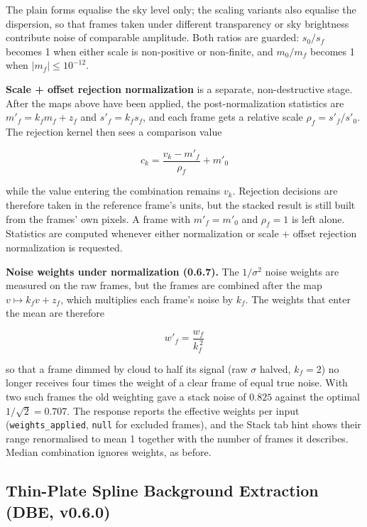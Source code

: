 \documentclass[11pt,a4paper]{article}
\newcommand{\code}[1]{\texttt{\small #1}}
\begin{document}
    The plain forms equalise the sky level only; the scaling variants also equalise the dispersion, so that frames taken under different transparency or sky brightness contribute noise of comparable amplitude. Both ratios are guarded: $s_0/s_f$ becomes 1 when either scale is non-positive or non-finite, and $m_0/m_f$ becomes 1 when $\left| m_f \right| \le 10^{-12}$.

    \textbf{Scale + offset rejection normalization} is a separate, non-destructive stage. After the maps above have been applied, the post-normalization statistics are $m'_f = k_f m_f + z_f$ and $s'_f = k_f s_f$, and each frame gets a relative scale $\rho_f = s'_f / s'_0$. The rejection kernel then sees a comparison value

    \begin{equation}
        \boxed{
            c_k = \frac{v_k - m'_f}{\rho_f} + m'_0
        }
    \end{equation}

    while the value entering the combination remains $v_k$. Rejection decisions are therefore taken in the reference frame's units, but the stacked result is still built from the frames' own pixels. A frame with $m'_f = m'_0$ and $\rho_f = 1$ is left alone. Statistics are computed whenever either normalization or scale + offset rejection normalization is requested.

    \textbf{Noise weights under normalization (0.6.7).} The $1/\sigma^2$ noise weights are measured on the raw frames, but the frames are combined after the map $v \mapsto k_f v + z_f$, which multiplies each frame's noise by $k_f$. The weights that enter the mean are therefore

    \begin{equation}
        \boxed{
            w'_f = \frac{w_f}{k_f^{\,2}}
        }
    \end{equation}

    so that a frame dimmed by cloud to half its signal (raw $\sigma$ halved, $k_f = 2$) no longer receives four times the weight of a clear frame of equal true noise. With two such frames the old weighting gave a stack noise of $0.825$ against the optimal $1/\sqrt{2} = 0.707$. The response reports the effective weights per input (\code{weights\_applied}, \code{null} for excluded frames), and the Stack tab hint shows their range renormalised to mean 1 together with the number of frames it describes. Median combination ignores weights, as before.

    \subsection{Thin-Plate Spline Background Extraction (DBE, v0.6.0)}
    \label{sec:dbe}
\end{document}
